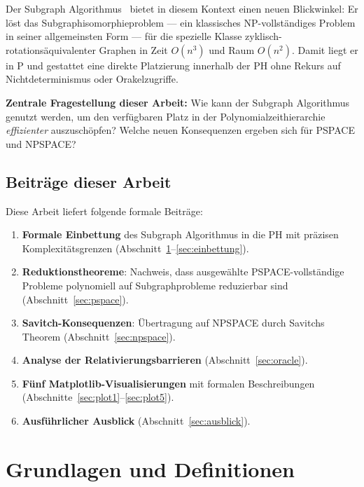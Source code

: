 ﻿\documentclass[a4paper,12pt]{article}
\theoremstyle{definition}
\begin{document}
Der Subgraph Algorithmus~\cite{epp2026subgraph} bietet in diesem Kontext einen neuen Blickwinkel:
Er löst das Subgraphisomorphieproblem --- ein klassisches NP-vollständiges Problem
in seiner allgemeinsten Form --- für die spezielle Klasse zyklisch-rotationsäquivalenter
Graphen in Zeit $O(n^3)$ und Raum $O(n^2)$.
Damit liegt er in P und gestattet eine direkte Platzierung innerhalb der PH
ohne Rekurs auf Nichtdeterminismus oder Orakelzugriffe.

\textbf{Zentrale Fragestellung dieser Arbeit:}
Wie kann der Subgraph Algorithmus genutzt werden, um den verfügbaren
Platz in der Polynomialzeithierarchie \emph{effizienter} auszuschöpfen?
Welche neuen Konsequenzen ergeben sich für PSPACE und NPSPACE?

\subsection{Beiträge dieser Arbeit}

Diese Arbeit liefert folgende formale Beiträge:

\begin{enumerate}
  \item \textbf{Formale Einbettung} des Subgraph Algorithmus in die PH mit präzisen
        Komplexitätsgrenzen (Abschnitt~\ref{sec:grundlagen}--\ref{sec:einbettung}).
  \item \textbf{Reduktionstheoreme}: Nachweis, dass ausgewählte PSPACE-vollständige
        Probleme polynomiell auf Subgraphprobleme reduzierbar sind
        (Abschnitt~\ref{sec:pspace}).
  \item \textbf{Savitch-Konsequenzen}: Übertragung auf NPSPACE durch
        Savitchs Theorem (Abschnitt~\ref{sec:npspace}).
  \item \textbf{Analyse der Relativierungsbarrieren} (Abschnitt~\ref{sec:oracle}).
  \item \textbf{Fünf Matplotlib-Visualisierungen} mit formalen Beschreibungen
        (Abschnitte~\ref{sec:plot1}--\ref{sec:plot5}).
  \item \textbf{Ausführlicher Ausblick} (Abschnitt~\ref{sec:ausblick}).
\end{enumerate}

\section{Grundlagen und Definitionen}
\label{sec:grundlagen}
\end{document}
